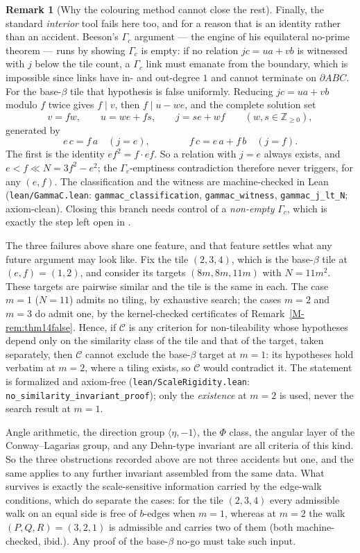 \documentclass[11pt,reqno]{amsart}
\theoremstyle{plain}
\theoremstyle{definition}
\newtheorem{remark}[theorem]{Remark}
\newcommand{\Z}{\mathbb{Z}}
\begin{document}
\begin{remark}[Why the colouring method cannot close the rest]
Finally, the standard \emph{interior} tool fails here too, and for a reason that is an identity
rather than an accident. Beeson's $\Gamma_c$ argument --- the engine of his equilateral no-prime
theorem --- runs by showing $\Gamma_c$ is empty: if no relation $jc=ua+vb$ is witnessed with $j$
below the tile count, a $\Gamma_c$ link must emanate from the boundary, which is impossible since
links have in- and out-degree $1$ and cannot terminate on $\partial ABC$. For the base-$\beta$ tile
that hypothesis is false uniformly. Reducing $jc=ua+vb$ modulo $f$ twice gives $f\mid v$, then
$f\mid u-we$, and the complete solution set
\[
v=fw,\qquad u=we+fs,\qquad j=se+wf \qquad (w,s\in\Z_{\ge0}),
\]
generated by
\[
e\,c=f\,a \quad (j=e), \qquad\qquad f\,c=e\,a+f\,b \quad (j=f).
\]
The first is the identity $e f^2=f\cdot ef$. So a relation with $j=e$ always exists, and
$e<f\ll N=3f^2-e^2$; the $\Gamma_c$-emptiness contradiction therefore never triggers, for any
$(e,f)$. The classification and the witness are machine-checked in Lean
(\texttt{lean/GammaC.lean}: \texttt{gammac\_classification}, \texttt{gammac\_witness},
\texttt{gammac\_j\_lt\_N}; axiom-clean). Closing this branch needs control of a \emph{non-empty} $\Gamma_c$, which is exactly the
step left open in \cite{BeesonIso}.

The three failures above share one feature, and that feature settles what any future argument may
look like. Fix the tile $(2,3,4)$, which is the base-$\beta$ tile at $(e,f)=(1,2)$, and consider its
targets $(8m,8m,11m)$ with $N=11m^2$. These targets are pairwise similar and the tile is the same in
each. The case $m=1$ ($N=11$) admits no tiling, by exhaustive search; the cases $m=2$ and $m=3$ do
admit one, by the kernel-checked certificates of Remark~\ref{M-rem:thm14false}. Hence, if $\mathcal C$
is any criterion for non-tileability whose hypotheses depend only on the similarity class of the tile
and that of the target, taken separately, then $\mathcal C$ cannot exclude the base-$\beta$ target at
$m=1$: its hypotheses hold verbatim at $m=2$, where a tiling exists, so $\mathcal C$ would contradict
it. The statement is formalized and axiom-free
(\texttt{lean/ScaleRigidity.lean}: \texttt{no\_similarity\_invariant\_proof}); only the
\emph{existence} at $m=2$ is used, never the search result at $m=1$.

Angle arithmetic, the direction group $\langle\eta,-1\rangle$, the $\Phi$ class, the angular layer of
the Conway--Lagarias group, and any Dehn-type invariant are all criteria of this kind. So the three
obstructions recorded above are not three accidents but one, and the same applies to any further
invariant assembled from the same data. What survives is exactly the scale-sensitive information
carried by the edge-walk conditions, which do separate the cases: for the tile $(2,3,4)$ every
admissible walk on an equal side is free of $b$-edges when $m=1$, whereas at $m=2$ the walk
$(P,Q,R)=(3,2,1)$ is admissible and carries two of them (both machine-checked, ibid.). Any proof of
the base-$\beta$ no-go must take such input.
\end{remark}
\end{document}
